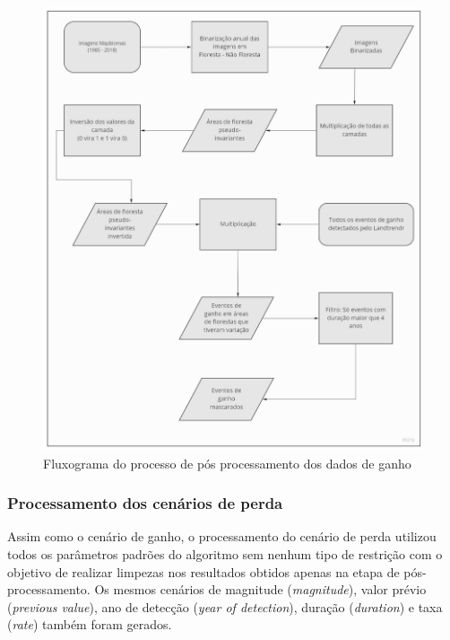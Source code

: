 \begin{figure}[H]
    \centering
    \includegraphics[scale=.4]{images/flow_ganho.pdf}
    \caption{Fluxograma do processo de pós processamento dos dados de ganho}
    \label{fig:flowchart_ganho}
\end{figure}


\subsubsection{Processamento dos cenários de perda}
\hspace{13pt} Assim como o cenário de ganho, o processamento do cenário de perda utilizou todos os parâmetros padrões do algoritmo sem nenhum tipo de restrição com o objetivo de realizar limpezas nos resultados obtidos apenas na etapa de pós-processamento. Os mesmos cenários de magnitude (\textit{magnitude}), valor prévio (\textit{previous value}), ano de detecção (\textit{year of detection}), duração (\textit{duration}) e taxa (\textit{rate}) também foram gerados.

